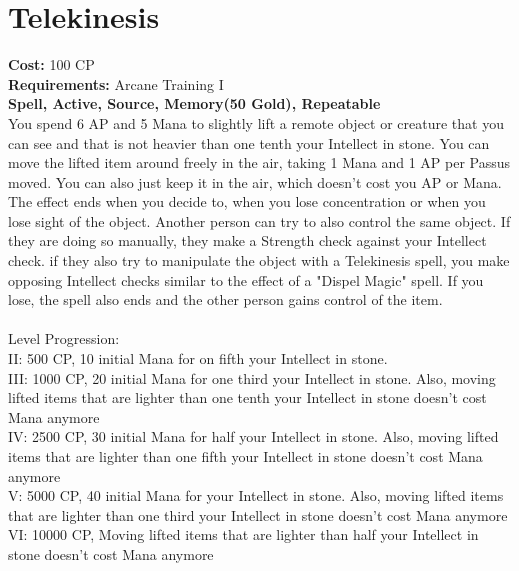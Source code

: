 \section{Telekinesis}
\textbf{Cost:} 100 CP\\
\textbf{Requirements:}  Arcane Training I\\
\textbf{Spell, Active, Source, Memory(50 Gold), Repeatable}\\
You spend 6 AP and 5 Mana to slightly lift a remote object or creature that you can see and that is not heavier than one tenth your Intellect in stone. You can move the lifted item around freely in the air, taking 1 Mana and 1 AP per Passus moved. You can also just keep it in the air, which doesn't cost you AP or Mana.\\
The effect ends when you decide to, when you lose concentration or when you lose sight of the object. Another person can try to also control the same object. If they are doing so manually, they make a Strength check against your Intellect check. if they also try to manipulate the object with a Telekinesis spell, you make opposing Intellect checks similar to the effect of a "Dispel Magic" spell. If you lose, the spell also ends and the other person gains control of the item.\\
\\
Level Progression:\\
II: 500 CP, 10 initial Mana for on fifth your Intellect in stone.\\
III: 1000 CP, 20 initial Mana for one third your Intellect in stone. Also, moving lifted items that are lighter than one tenth your Intellect in stone doesn't cost Mana anymore\\
IV: 2500 CP, 30 initial Mana for half your Intellect in stone. Also, moving lifted items that are lighter than one fifth your Intellect in stone doesn't cost Mana anymore\\
V: 5000 CP, 40 initial Mana for your Intellect in stone. Also, moving lifted items that are lighter than one third your Intellect in stone doesn't cost Mana anymore\\
VI: 10000 CP, Moving lifted items that are lighter than half your Intellect in stone doesn't cost Mana anymore\\